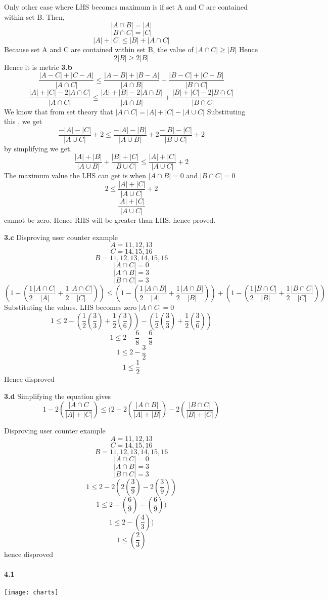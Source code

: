 \documentclass{article}
\begin{document}
Only other case where LHS becomes maximum is if set A and C are contained within set B. Then,
$$|A\cap B| = |A|$$
$$|B\cap C| = |C|$$
$$|A|+|C| \leq |B| + |A \cap C|$$
Because set A and C are contained within set B, the value of $|A \cap C| \geq |B|$
Hence $$2|B|\geq2|B|$$
Hence it is metric\newline 
\textbf{3.b}
$$\frac{|A-C|+|C-A|}{|A\cap C|} \leq \frac{|A-B|+|B-A|}{|A \cap B|}+\frac{|B-C|+|C-B|}{|B \cap C|}$$
$$\frac{|A|+|C|-2|A \cap C|}{|A\cap C|} \leq \frac{|A|+|B|-2|A \cap B|}{|A\cap B|} + \frac{|B|+|C|-2|B \cap C|}{|B\cap C|}$$
We know that from set theory that $|A \cap C| = |A|+|C|- |A\cup C|$
Substituting this , we get
$$ \frac{-|A|-|C|}{|A\cup C|}+2 \leq \frac{-|A|-|B|}{|A\cup B|}+2 \frac{-|B|-|C|}{|B\cup C|}+2$$
by simplifying we get.
$$\frac{|A|+|B|}{|A\cup B|}+\frac{|B|+|C|}{|B\cup C|} \leq \frac{|A|+|C|}{|A\cup C|}+2$$
The maximum value the LHS can get is when $|A\cap B|=0$ and $|B \cap C|=0$
$$2\leq\frac{|A|+|C|}{|A\cup C|}+2$$
$$\frac{|A|+|C|}{|A\cup C|}$$ cannot be zero. Hence RHS will be greater than LHS. hence proved.

\textbf{3.c}
Disproving user counter example
$$A={11,12,13}$$
$$C={14,15,16}$$
$$B={11,12,13,14,15,16}$$
$$|A\cap C|=0$$
$$|A\cap B|=3$$
$$|B\cap C|=3$$
$$(1-(\frac{1}{2}\frac{|A\cap C|}{|A|}+\frac{1}{2}\frac{|A\cap C|}{|C|})) \leq (1-(\frac{1}{2}\frac{|A\cap B|}{|A|}+\frac{1}{2}\frac{|A\cap B|}{|B|}))+(1-(\frac{1}{2}\frac{|B\cap C|}{|B|}+\frac{1}{2}\frac{|B\cap C|}{|C|}))$$
Substituting the values. LHS becomes zero $|A \cap C| = 0$
$$1\leq 2 - (\frac{1}{2}(\frac{3}{3})+\frac{1}{2}(\frac{3}{6})) - (\frac{1}{2}(\frac{3}{3})+\frac{1}{2}(\frac{3}{6}))$$
$$1\leq 2 - \frac{6}{8} - \frac{6}{8}$$
$$1\leq 2-\frac{3}{2}$$
$$1\leq \frac{1}{2}$$
Hence disproved

\textbf{3.d}
Simplifying the equation gives \newline
$$1-2(\frac{|A\cap C}{|A|+|C|}) \leq (2 - 2(\frac{|A\cap B|}{|A|+|B|})-2(\frac{|B\cap C|}{|B|+|C|})$$

Disproving user counter example
$$A={11,12,13}$$
$$C={14,15,16}$$
$$B={11,12,13,14,15,16}$$
$$|A\cap C|=0$$
$$|A\cap B|=3$$
$$|B\cap C|=3$$
$$1 \leq 2-2(2(\frac{3}{9})-2(\frac{3}{9}))$$
$$1 \leq 2-(\frac{6}{9})-(\frac{6}{9}))$$
$$1 \leq 2-(\frac{4}{3}))$$
$$1 \leq (\frac{2}{3})$$
hence disproved

\paragraph{4.1}
\texttt{[image: charts]}
\end{document}
